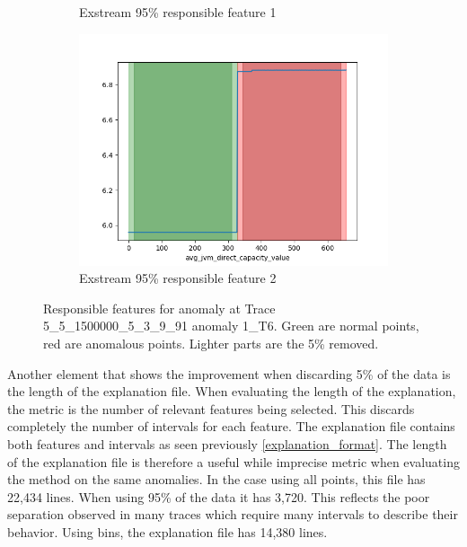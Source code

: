 \documentclass[oneside, a4paper, onecolumn, 11pt]{article}
\begin{document}
\begin{figure}[H]
\begin{subfigure}{0.3\textwidth}
      \caption{Exstream 95\% responsible feature 1}
  \end{subfigure}
  \hfill
  \begin{subfigure}{0.3\textwidth}
      \centering
      \includegraphics[width=\linewidth]{images/ex_remove52.png}
      \caption{Exstream 95\% responsible feature 2}
  \end{subfigure}
  \caption{Responsible features for anomaly at Trace 5\_5\_1500000\_5\_3\_9\_91 anomaly 1\_T6. Green are normal points, red are anomalous points. Lighter parts are the 5\% removed.}
\end{figure}
Another element that shows the improvement when discarding 5\% of the data is the length of the explanation file. When evaluating the length of the explanation, the metric is the number of relevant features being selected. This discards completely the number of intervals for each feature. The explanation file contains both features and intervals as seen previously \autoref{explanation_format}. The length of the explanation file is therefore a useful while imprecise metric when evaluating the method on the same anomalies. In the case using all points, this file has 22,434 lines. When using 95\% of the data it has 3,720. This reflects the poor separation observed in many traces which require many intervals to describe their behavior. Using bins, the explanation file has 14,380 lines.\\
\end{document}
